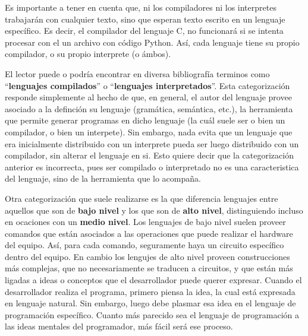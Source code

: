 Es importante a tener en cuenta que, ni los compiladores ni los interpretes trabajarán
con cualquier texto, sino que esperan texto escrito en un lenguaje específico.
Es decir, el compilador del lenguaje C, no funcionará si se intenta procesar con
el un archivo con código Python. Así, cada lenguaje tiene su propio compilador,
o su propio interprete (o ámbos).

El lector puede o podría encontrar en diversa bibliografía terminos como
``\textbf{lenguajes compilados}'' o ``\textbf{lenguajes interpretados}''. Esta
categorización responde simplemente al hecho de que, en general, el autor del
lenguaje provee asociado a la definción su lenguaje (gramática, semántica, etc.),
la herramienta que permite generar programas en dicho lenguaje (la cuál suele ser
o bien un compilador, o bien un interpete). Sin embargo, nada evita que
un lenguaje que era inicialmente distribuido con un interprete pueda ser luego
distribuido con un compilador, sin alterar el lenguaje en si. Esto quiere
decir que la categorización anterior es incorrecta, pues ser compilado o
interpretado no es una caracteristica del lenguaje, sino de la herramienta que
lo acompaña.

Otra categorización que suele realizarse es la que diferencia lenguajes entre
aquellos que son de \textbf{bajo nivel} y los que son de \textbf{alto nivel},
distinguiendo incluso en ocaciones con un \textbf{medio nivel}. Los lenguajes
de bajo nivel suelen proveer comandos que están asociados a las operaciones que
puede realizar el hardware del equipo. Así, para cada comando, seguramente haya
un circuito específico dentro del equipo. En cambio los lengujes de alto nivel
proveen construcciones más complejas, que no necesariamente se traducen a circuitos,
y que están más ligadas a ideas o conceptos que el desarrollador puede querer
expresar. Cuando el desarrollador realiza el programa, primero piensa la idea,
la cual está expresada en lenguaje natural. Sin embargo, luego debe plasmar esa
idea en el lenguaje de programación específico. Cuanto más parecido sea el lenguaje
de programación a las ideas mentales del programador, más fácil será ese proceso.
\autocite{wexelblat_1981}

